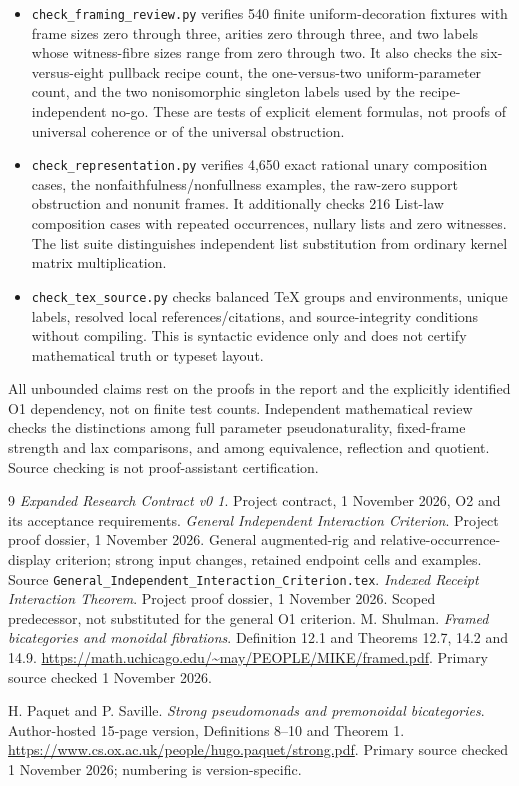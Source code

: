 \documentclass[11pt,a4paper]{article}
\theoremstyle{definition}
\begin{document}
\begin{itemize}
\item \texttt{check\_framing\_review.py} verifies 540 finite uniform-decoration
fixtures with frame sizes zero through three, arities zero through three,
and two labels whose witness-fibre sizes range from zero through two. It
also checks the six-versus-eight pullback recipe count, the one-versus-two
uniform-parameter count, and the two nonisomorphic singleton labels used by
the recipe-independent no-go. These are tests of explicit element formulas,
not proofs of universal coherence or of the universal obstruction.
\item \texttt{check\_representation.py} verifies 4,650 exact rational unary
composition cases, the nonfaithfulness/nonfullness examples, the raw-zero
support obstruction and nonunit frames. It additionally checks 216 List-law
composition cases with repeated occurrences, nullary lists and zero witnesses.
The list suite distinguishes independent list substitution from ordinary
kernel matrix multiplication.
\item \texttt{check\_tex\_source.py} checks balanced TeX groups and environments,
unique labels, resolved local references/citations, and source-integrity
conditions without compiling. This is syntactic evidence only and does not
certify mathematical truth or typeset layout.
\end{itemize}
All unbounded claims rest on the proofs in the report and the explicitly
identified O1 dependency, not on finite test counts. Independent mathematical
review checks the distinctions among full parameter pseudonaturality,
fixed-frame strength and lax comparisons, and among equivalence, reflection
and quotient. Source checking is not proof-assistant certification.

\begin{thebibliography}{9}
\emph{Expanded Research Contract v0 1}. Project contract, 1 November 2026,
O2 and its acceptance requirements. 
\emph{General Independent Interaction Criterion}. Project proof dossier,
1 November 2026. General augmented-rig and relative-occurrence-display
criterion; strong input changes, retained endpoint cells and examples.
Source \texttt{General\_Independent\_Interaction\_Criterion.tex}.
\emph{Indexed Receipt Interaction Theorem}. Project proof dossier,
1 November 2026. Scoped predecessor, not substituted for the general O1
criterion. 
M. Shulman. \emph{Framed bicategories and monoidal fibrations}.
Definition 12.1 and Theorems 12.7, 14.2 and 14.9.
\url{https://math.uchicago.edu/~may/PEOPLE/MIKE/framed.pdf}.
Primary source checked 1 November 2026.

H. Paquet and P. Saville.
\emph{Strong pseudomonads and premonoidal bicategories}.
Author-hosted 15-page version, Definitions 8--10 and Theorem 1.
\url{https://www.cs.ox.ac.uk/people/hugo.paquet/strong.pdf}.
Primary source checked 1 November 2026; numbering is version-specific.
\end{thebibliography}
\end{document}

